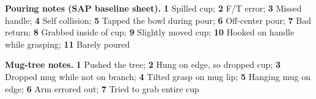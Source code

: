 \documentclass[10pt]{article}
\begin{document}
\noindent\footnotesize\textbf{Pouring notes (SAP baseline sheet).} \textbf{1} Spilled cup; \textbf{2} F/T error; \textbf{3} Missed handle; \textbf{4} Self collision; \textbf{5} Tapped the bowl during pour; \textbf{6} Off-center pour; \textbf{7} Bad return; \textbf{8} Grabbed inside of cup; \textbf{9} Slightly moved cup; \textbf{10} Hooked on handle while grasping; \textbf{11} Barely poured\normalsize\par\medskip
\noindent\footnotesize\textbf{Mug-tree notes.} \textbf{1} Pushed the tree; \textbf{2} Hung on edge, so dropped cup; \textbf{3} Dropped mug while not on branch; \textbf{4} Tilted grasp on mug lip; \textbf{5} Hanging mug on edge; \textbf{6} Arm errored out; \textbf{7} Tried to grab entire cup\normalsize\par\medskip
\end{document}
